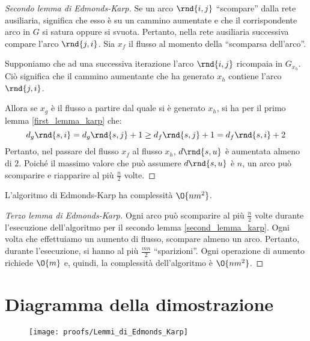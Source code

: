 \documentclass[\main/main.tex]{subfiles}
\begin{document}
\begin{proof}[Secondo lemma di Edmonds-Karp]
  Se un arco \(\rnd{i, j}\) ``scompare'' dalla rete ausiliaria, significa che esso è su un cammino aumentate e che il corrispondente arco in \(G\) si satura oppure si svuota. Pertanto, nella rete ausiliaria successiva compare l'arco \(\rnd{j, i}\). Sia \(x_f\) il flusso al momento della ``scomparsa dell'arco''.

  Supponiamo che ad una successiva iterazione l'arco \(\rnd{i, j}\) ricompaia in \(G_{x_h}\). Ciò significa che il cammino aumentante che ha generato \(x_h\) contiene l'arco \(\rnd{j, i}\).

  Allora se \(x_g\) è il flusso a partire dal quale si è generato \(x_h\), si ha per il primo lemma \ref{first_lemma_karp} che:
  \[
    d_g\rnd{s, i} = d_g\rnd{s, j} + 1 \geq d_f\rnd{s, j} + 1 = d_f\rnd{s, i} + 2
  \]
  Pertanto, nel passare del flusso \(x_f\) al flusso \(x_h\), \(d\rnd{s, u}\) è aumentata almeno di \(2\). Poiché il massimo valore che può assumere \(d\rnd{s, u}\) è \(n\), un arco può scomparire e riapparire al più \(\frac{n}{2}\) volte.
\end{proof}

\begin{lemma}
  L'algoritmo di Edmonds-Karp ha complessità \(\O{nm^2}\).
\end{lemma}
\begin{proof}[Terzo lemma di Edmonds-Karp]
  Ogni arco può scomparire al più \(\frac{n}{2}\) volte durante l'esecuzione dell'algoritmo per il secondo lemma \ref{second_lemma_karp}. Ogni volta che effettuiamo un aumento di flusso, scompare almeno un arco. Pertanto, durante l'esecuzione, si hanno al più \(\frac{mn}{2}\) ``sparizioni''. Ogni operazione di aumento richiede \(\O{m}\) e, quindi, la complessità dell'algoritmo è \(\O{nm^2}\).
\end{proof}
\clearpage
\section{Diagramma della dimostrazione}
\begin{figure}
  \texttt{[image: proofs/Lemmi\_di\_Edmonds\_Karp]}
\end{figure}
\end{document}
